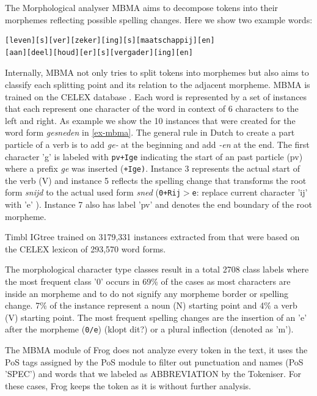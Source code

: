 \documentclass{book}
\begin{document}
The Morphological analyser MBMA \cite{MBMA} aims to decompose tokens into their morphemes reflecting possible spelling changes. Here we show two example words:
\begin{example}
\label{ex-longword}\begin{verbatim}
[leven][s][ver][zeker][ing][s][maatschappij][en]
[aan][deel][houd][er][s][vergader][ing][en]
\end{verbatim}
\end{example}
Internally, MBMA not only tries to split tokens into morphemes but also aims to classify each splitting point and its relation to the adjacent morpheme. MBMA is trained on the CELEX database \cite{Baayen+93}. Each word is represented by a set of instances that each represent one character of the word in context of 6 characters to the left and right. As example we show the 10 instances that were created for the word form {\it gesneden} in \ref{ex-mbma}. The general rule in Dutch to create a part particle of a verb is to add {\it ge-} at the beginning and add {\it -en} at the end. The first character 'g' is labeled with {\tt pv+Ige} indicating the start of an past particle (pv) where a prefix {\it ge} was inserted ({\tt +Ige)}. Instance 3 represents the actual start of the verb (V) and instance 5 reflects the spelling change that transforms the root form {\it snijd} to the actual used form {\it sned} ({\tt 0+Rij$>$e}: replace current character 'ij' with 'e' ). Instance 7 also has label 'pv' and denotes the end boundary of the root morpheme.

Timbl IGtree \cite{timbl} trained on 3179,331 instances extracted from that were based on the CELEX lexicon of 293,570 word forms. %

The morphological character type classes result in a total 2708 class labels where the most frequent class '0' occurs in 69\% of the cases as most characters are inside an morpheme and to do not signify any morpheme border or spelling change.  %
7\% of the instance represent a noun (N) starting point and 4\% a verb (V) starting point. The most frequent spelling changes are the insertion of an 'e' after the morpheme ({\tt 0/e}) (klopt dit?) or a plural inflection (denoted as 'm').

The MBMA module of Frog does not analyze every token in the text, it uses the PoS tags assigned by the PoS module to filter out punctuation and names (PoS 'SPEC') and words that we labeled as ABBREVIATION by the Tokeniser. For these cases, Frog keeps the token as it is without further analysis.
\end{document}
